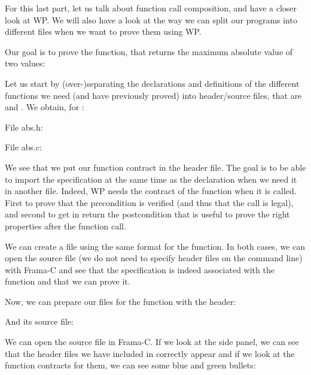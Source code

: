 For this last part, let us talk about function call composition,
and have a closer look at WP. We will also have a look at the way we can split
our programs into different files when we want to prove them using WP.

Our goal is to prove the  function, that returns
the maximum absolute value of two values:






Let us start by (over-)separating the declarations and definitions of the
different functions we need (and have previously proved) into header/source
files, that are  and . We obtain, for
:



File abs.h:




File abs.c:




We see that we put our function contract in the header file.
The goal is to be able to import the specification at the same time as
the declaration when we need it in another file. Indeed, WP needs the
contract of the function when it is called. First to prove that the
precondition is verified (and thus that the call is legal), and second
to get in return the postcondition that is useful to prove the right
properties after the function call.

We can create a file using the same format for the 
function. In both cases, we can open the source file (we do not need to
specify header files on the command line) with Frama-C and see that
the specification is indeed associated with the function and that we can prove
it.


Now, we can prepare our files for the  function with
the header:






And its source file:






We can open the source file in Frama-C. If we look at the side panel, we
can see that the header files we have included in 
correctly appear and if we look at the function contracts for them, we
can see some blue and green bullets:



